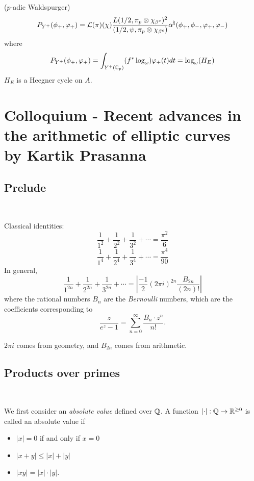 \documentclass[12pt,amsfont]{amsart}
\begin{document}
\begin{thm} ($p$-adic Waldspurger) 
\[P_{Y^+}(\phi_+, \varphi_+) = \mathcal{L}(\pi)(\chi) \frac{L(1/2, \pi_p \otimes \chi_{\beta^c})^2}{(1/2,\psi,\pi_p \otimes \chi_{\beta^c})} \alpha^\natural(\phi_+, \phi_{-}, \varphi_+, \varphi_{-})\]
where
\[P_{Y^+}(\phi_+, \varphi_+) = \int_{Y^+({\mathbb C}_p)} (f^\ast \log_\omega) \varphi_+(t)dt = \log_\omega(H_E)\]
$H_E$ is a Heegner cycle on $A$.
\end{thm}

\renewcommand{\thesubsection}{\arabic{section}.R}
\begingroup
\renewcommand{\addcontentsline}[3]{}%
\endgroup
\newpage
\section{Colloquium - Recent advances in the arithmetic of elliptic curves\\ by Kartik Prasanna}\label{17}
\renewcommand{\thesubsection}{\arabic{section}.\arabic{subsection}}

\subsection{Prelude}
{\ }

Classical identities: 
\[\frac{1}{1^2} + \frac{1}{2^2} + \frac{1}{3^2} + \cdots = \frac{\pi^2}{6}\]
\[\frac{1}{1^4} + \frac{1}{2^4} + \frac{1}{3^4} + \cdots = \frac{\pi^4}{90}\]
In general,
\[\frac{1}{1^{2n}} + \frac{1}{2^{2n}} + \frac{1}{3^{2n}} + \cdots =  \left \lvert \frac{-1}{2} (2 \pi i)^{2n} \frac{B_{2n}}{(2n)!} \right \rvert \]
where the rational numbers $B_n$ are the \emph{Bernoulli} numbers, which are the coefficients corresponding to
\[\frac{z}{e^z - 1} = \sum_{n=0}^\infty \frac{B_n \cdot z^n}{n!}. \]
\begin{rmk}
$2\pi i$ comes from geometry, and $B_{2n}$ comes from arithmetic. 
\end{rmk}
\subsection{Products over primes}
{\ }

We first consider an \emph{absolute value} defined over ${\mathbb Q}$. A function $\lvert \cdot \rvert: {\mathbb Q} \rightarrow {\mathbb R}^{\geq 0}$ is called an absolute value if
{\ }
\begin{itemize}
\item
$\lvert x \rvert = 0$ if and only if $x = 0$ 
\item
$\lvert x + y \rvert \leq \lvert x \rvert + \lvert y \rvert$
\item
$\lvert xy \rvert = \lvert x \rvert \cdot \lvert y \rvert$.
\end{itemize}
\end{document}
